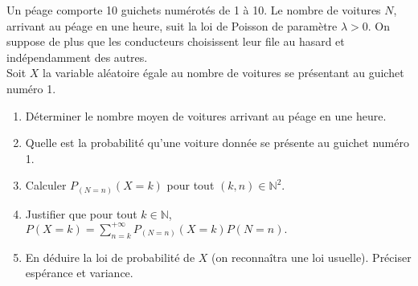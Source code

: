 \documentclass[a4paper,10pt]{report}
\begin{document}
\begin{Exa} Un péage comporte 10 guichets numérotés de 1 à 10. Le nombre de voitures $N$, arrivant au péage en une heure, suit la loi de Poisson de paramètre $\lambda>0$. On suppose de plus que les conducteurs choisissent leur file au hasard et indépendamment des autres.\\
Soit $X$ la variable aléatoire égale au nombre de voitures se présentant au guichet numéro 1.
\begin{enumerate}
\item Déterminer le nombre moyen de voitures arrivant au péage en une heure.
\item Quelle est la probabilité qu'une voiture donnée se présente au guichet numéro 1.
\item Calculer $P_{(N=n)}(X=k)$ pour tout $(k,n) \in \mathbb{N}^2$.
\item Justifier que pour tout $k \in \mathbb{N}$, $\displaystyle{P(X=k)=\sum_{n=k}^{+\infty}P_{(N=n)}(X=k) P(N=n).}$
\item En déduire la loi de probabilité de $X$ (on reconnaîtra une loi usuelle). Préciser espérance et variance.
\end{enumerate}
\end{Exa}

\corr 
\end{document}
